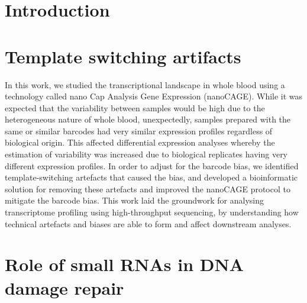 \documentclass[10pt,a4paper]{report}
\begin{document}



\chapter{Introduction}\label{intro}


\chapter{Template switching artifacts}\label{template_switching}


In this work, we studied the transcriptional landscape in whole blood using a technology called nano Cap Analysis Gene Expression (nanoCAGE). While it was expected that the variability between samples would be high due to the heterogeneous nature of whole blood, unexpectedly, samples prepared with the same or similar barcodes had very similar expression profiles regardless of biological origin. This affected differential expression analyses whereby the estimation of variability was increased due to biological replicates having very different expression profiles. In order to adjust for the barcode bias, we identified template-switching artefacts that caused the bias, and developed a bioinformatic solution for removing these artefacts and improved the nanoCAGE protocol to mitigate the barcode bias. This work laid the groundwork for analysing transcriptome profiling using high-throughput sequencing, by understanding how technical artefacts and biases are able to form and affect downstream analyses.



\chapter{Role of small RNAs in DNA damage repair}\label{ddrna}

\end{document}

